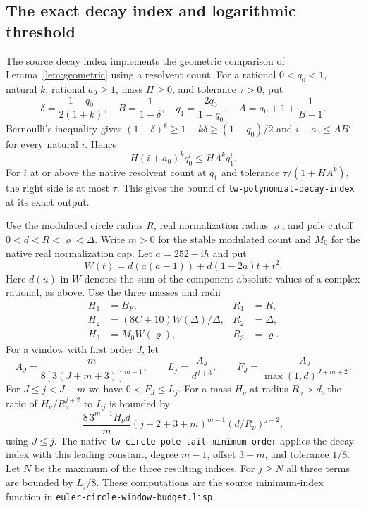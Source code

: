 \documentclass[11pt]{amsart}
\theoremstyle{definition}
\theoremstyle{remark}
\numberwithin{equation}{section}
\newcommand{\code}[1]{\nolinkurl{#1}}
\begin{document}
\subsection{The exact decay index and logarithmic threshold}

The source decay index implements the geometric comparison
of Lemma~\ref{lem:geometric} using a resolvent count.
For a rational \(0<q_0<1\), natural \(k\), rational \(a_0\ge1\),
mass \(H\ge0\), and tolerance \(\tau>0\), put
\[
  \delta=\frac{1-q_0}{2(1+k)},\quad
  B=\frac1{1-\delta},\quad
  q_1=\frac{2q_0}{1+q_0},\quad
  A=a_0+1+\frac1{B-1}.
\]
Bernoulli's inequality gives
\((1-\delta)^k\ge1-k\delta\ge(1+q_0)/2\)
and \(i+a_0\le AB^i\) for every natural \(i\).
Hence
\[
       H(i+a_0)^k q_0^i\le H A^k q_1^i .
\]
For \(i\) at or above the native resolvent count at
\(q_1\) and tolerance \(\tau/(1+H A^k)\),
the right side is at most \(\tau\).
This gives the bound of
\code{lw-polynomial-decay-index} at its exact output.

Use the modulated circle radius \(R\), real
normalization radius \(\varrho\), and pole cutoff
\(0<d<R<\varrho<\Delta\). Write \(m>0\)
for the stable modulated count and \(M_0\) for the
native real normalization cap. Let \(a=252+\mathrm i h\)
and put
\[
    W(t)=d(a(a-1))+d(1-2a)t+t^2 .
\]
Here \(d(u)\) in \(W\) denotes the sum of the component
absolute values of a complex rational, as above.
Use the three masses and radii
\begin{align*}
   H_1&=B_F, & R_1&=R,\\
   H_2&=(8C+10)W(\Delta)/\Delta, & R_2&=\Delta,\\
   H_3&=M_0W(\varrho), & R_3&=\varrho .
\end{align*}
For a window with first order \(J\), let
\[
   A_J=\frac{m}{8[3(J+m+3)]^{m-1}},\qquad
   L_j=\frac{A_J}{d^{j+3}},\qquad
   F_J=\frac{A_J}{\max(1,d)^{J+m+2}} .
\]
For \(J\le j<J+m\) we have \(0<F_J\le L_j\).
For a mass \(H_\nu\) at radius \(R_\nu>d\), the
ratio of \(H_\nu/R_\nu^{j+2}\) to \(L_j\) is bounded by
\[
       \frac{8\,3^{m-1}H_\nu d}{m}
               (j+2+3+m)^{m-1}(d/R_\nu)^{j+2},
\]
using \(J\le j\).
The native \code{lw-circle-pole-tail-minimum-order}
applies the decay index with this leading constant,
degree \(m-1\), offset \(3+m\), and tolerance \(1/8\).
Let \(N\) be the maximum of the three resulting
indices. For \(j\ge N\) all three terms are bounded
by \(L_j/8\). These computations are the source
minimum-index function in
\code{euler-circle-window-budget.lisp}.
\end{document}
